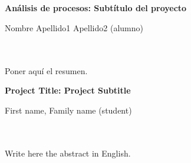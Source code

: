 \chapter*{}






\cleardoublepage
\thispagestyle{empty}

\begin{center}
{\large\bfseries Análisis de procesos: Subtítulo del proyecto}\\
\end{center}
\begin{center}
Nombre Apellido1 Apellido2 (alumno)\\
\end{center}

\\

\vspace{0.7cm}
\\

Poner aquí el resumen.
\cleardoublepage


\thispagestyle{empty}


\begin{center}
{\large\bfseries Project Title: Project Subtitle}\\
\end{center}
\begin{center}
First name, Family name (student)\\
\end{center}

\\

\vspace{0.7cm}
\\

Write here the abstract in English.

\chapter*{}
\thispagestyle{empty}

